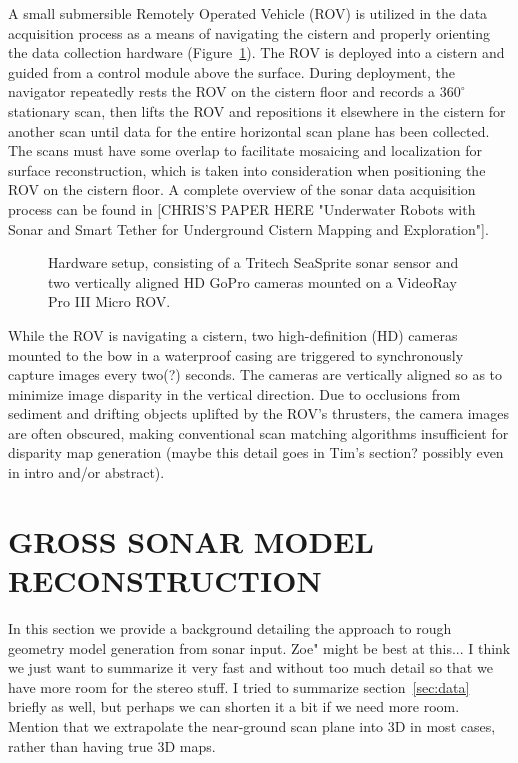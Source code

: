 \documentclass[a4paper,twoside]{article}
\begin{document}
\noindent A small submersible Remotely Operated Vehicle (ROV) is utilized in the data acquisition process as a means of navigating the cistern and properly orienting the data collection hardware (Figure~\ref{fig:ROV}). The ROV is deployed into a cistern and guided from a control module above the surface. During deployment, the navigator repeatedly rests the ROV on the cistern floor and records a $360^{\circ}$ stationary scan, then lifts the ROV and repositions it elsewhere in the cistern for another scan until data for the entire horizontal scan plane has been collected. The scans must have some overlap to facilitate mosaicing and localization for surface reconstruction, which is taken into consideration when positioning the ROV on the cistern floor. A complete overview of the sonar data acquisition process can be found in [CHRIS'S PAPER HERE "Underwater Robots with Sonar and Smart Tether for Underground Cistern Mapping and Exploration"].
\begin{figure}[!h]
   \vspace{-0.2cm}
   \caption{Hardware setup, consisting of a Tritech SeaSprite sonar sensor and two vertically aligned HD GoPro cameras mounted on a VideoRay Pro III Micro ROV.}
  \label{fig:ROV}
 \end{figure}

While the ROV is navigating a cistern, two high-definition (HD) cameras mounted to the bow in a waterproof casing are triggered to synchronously capture images every two(?) seconds. The cameras are vertically aligned so as to minimize image disparity in the vertical direction. Due to occlusions from sediment and drifting objects uplifted by the ROV's thrusters, the camera images are often obscured, making conventional scan matching algorithms insufficient for disparity map generation (maybe this detail goes in Tim's section? possibly even in intro and/or abstract).

\section{\uppercase{Gross sonar Model Reconstruction}}
\label{sec:reconstruction}


\noindent In this section we provide a background detailing the approach to rough geometry model generation from sonar input. Zoe" might be best at this... I think we just want to summarize it very fast and without too much detail so that we have more room for the stereo stuff. I tried to summarize section~\ref{sec:data} briefly as well, but perhaps we can shorten it a bit if we need more room. Mention that we extrapolate the near-ground scan plane into 3D in most cases, rather than having true 3D maps.
\end{document}
